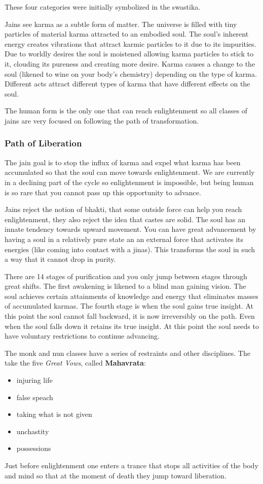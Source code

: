 \documentclass{article}
\begin{document}
These four categories were initially symbolized in the swastika.

Jains see karma as a subtle form of matter. The universe is filled with tiny particles of material karma attracted to an embodied soul. The soul's inherent energy creates vibrations that attract karmic particles to it due to its impurities. Due to worldly desires the soul is moistened allowing karma particles to stick to it, clouding its pureness and creating more desire. Karma causes a change to the soul (likened to wine on your body's chemistry) depending on the type of karma. Different acts attract different types of karma that have different effects on the soul.

The human form is the only one that can reach enlightenment so all classes of jains are very focused on following the path of transformation.

\subsubsection*{Path of Liberation}
\label{ssub:path_of_liberation}
The jain goal is to stop the influx of karma and expel what karma has been accumulated so that the soul can move towards enlightenment. We are currently in a declining part of the cycle so enlightenment is impossible, but being human is so rare that you cannot pass up this opportunity to advance.

Jains reject the notion of bhakti, that some outside force can help you reach enlightenment, they also reject the idea that castes are solid. The soul has an innate tendency towards upward movement. You can have great advancement by having a soul in a relatively pure state an an external force that activates its energies (like coming into contact with a jinas). This transforms the soul in such a way that it cannot drop in purity.

There are 14 stages of purification and you only jump between stages through great shifts. The first awakening is likened to a blind man gaining vision. The soul achieves certain attainments of knowledge and energy that eliminates masses of accumulated karmas. The fourth stage is when the soul gains true insight. At this point the soul cannot fall backward, it is now irreversibly on the path. Even when the soul falls down it retains its true insight. At this point the soul needs to have voluntary restrictions to continue advancing.

The monk and nun classes have a series of restraints and other disciplines. The take the five \emph{Great Vows}, called \textbf{Mahavrata}:
\begin{itemize}
   	\item injuring life
   	\item false speach
   	\item taking what is not given
   	\item unchastity
   	\item possessions
\end{itemize}
Just before enlightenment one enters a trance that stops all activities of the body and mind so that at the moment of death they jump toward liberation.
\end{document}
